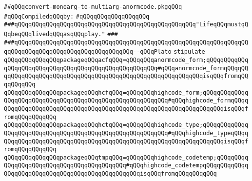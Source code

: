 \label{src/lib/compiler/back/top/lambdacode/convert-monoarg-to-multiarg-anormcode.api}
\verb|##qQQqconvert-monoarg-to-multiarg-anormcode.pkgqQQq|\newline
\newline
\verb|#qQQqCompiledqQQqby:|\newline
\verb|#qQQqqQQqqQQqqQQqqQQq|\newline
\newline
\newline
\newline
\verb|###qQQqqQQqqQQqqQQqqQQqqQQqqQQqqQQqqQQqqQQqqQQqqQQqqQQq"LifeqQQqmustqQQqbeqQQqlivedqQQqasqQQqplay."|\newline
\verb|###|\newline
\verb|###qQQqqQQqqQQqqQQqqQQqqQQqqQQqqQQqqQQqqQQqqQQqqQQqqQQqqQQqqQQqqQQqqQQqqQQqqQQqqQQqqQQqqQQqqQQqqQQqqQQqqQQq--qQQqPlato|\newline
\newline
\newline
\newline
\verb|stipulate|\newline
\verb|qQQqqQQqqQQqqQQqpackageqQQqacfqQQq=qQQqqQQqanormcode_form;qQQqqQQqqQQqqQQqqQQqqQQqqQQqqQQqqQQqqQQqqQQqqQQqqQQqqQQq#qQQqanormcode_formqQQqqQQqqQQqqQQqqQQqqQQqqQQqqQQqqQQqqQQqqQQqqQQqqQQqqQQqqQQqqQQqisqQQqfromqQQqqQQqqQQq|\newline
\verb|qQQqqQQqqQQqqQQqpackageqQQqhcfqQQq=qQQqqQQqhighcode_form;qQQqqQQqqQQqqQQqqQQqqQQqqQQqqQQqqQQqqQQqqQQqqQQqqQQqqQQqqQQq#qQQqhighcode_formqQQqqQQqqQQqqQQqqQQqqQQqqQQqqQQqqQQqqQQqqQQqqQQqqQQqqQQqqQQqqQQqqQQqisqQQqfromqQQqqQQqqQQq|\newline
\verb|qQQqqQQqqQQqqQQqpackageqQQqhctqQQq=qQQqqQQqhighcode_type;qQQqqQQqqQQqqQQqqQQqqQQqqQQqqQQqqQQqqQQqqQQqqQQqqQQqqQQqqQQq#qQQqhighcode_typeqQQqqQQqqQQqqQQqqQQqqQQqqQQqqQQqqQQqqQQqqQQqqQQqqQQqqQQqqQQqqQQqqQQqisqQQqfromqQQqqQQqqQQq|\newline
\verb|qQQqqQQqqQQqqQQqpackageqQQqtmpqQQq=qQQqqQQqhighcode_codetemp;qQQqqQQqqQQqqQQqqQQqqQQqqQQqqQQqqQQqqQQqqQQq#qQQqhighcode_codetempqQQqqQQqqQQqqQQqqQQqqQQqqQQqqQQqqQQqqQQqqQQqqQQqqQQqisqQQqfromqQQqqQQqqQQq|\newline
